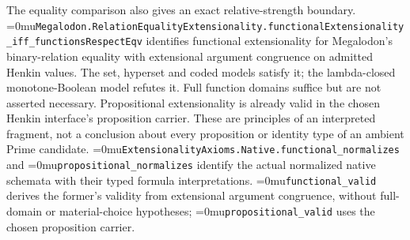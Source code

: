 \documentclass[11pt]{article}
\newcommand{\leanname}[1]{\textup{\Urlmuskip=0mu\relax\nolinkurl{#1}}}
\theoremstyle{definition}
\theoremstyle{remark}
\begin{document}
The equality comparison also gives an exact relative-strength boundary.
\leanname{Megalodon.RelationEqualityExtensionality.functionalExtensionality_iff_functionsRespectEqv}
identifies functional extensionality for Megalodon's binary-relation equality
with extensional argument congruence on admitted Henkin values.
The set, hyperset and coded models satisfy it; the lambda-closed
monotone-Boolean model refutes it. Full function domains suffice but are not
asserted necessary. Propositional extensionality is already valid in the
chosen Henkin interface's proposition carrier. These are principles of an
interpreted fragment, not a conclusion about every proposition or identity
type of an ambient Prime candidate.
\leanname{ExtensionalityAxioms.Native.functional_normalizes} and
\leanname{propositional_normalizes} identify the actual normalized native
schemata with their typed formula interpretations.
\leanname{functional_valid} derives the former's validity from extensional
argument congruence, without full-domain or material-choice hypotheses;
\leanname{propositional_valid} uses the chosen proposition carrier.
\end{document}
